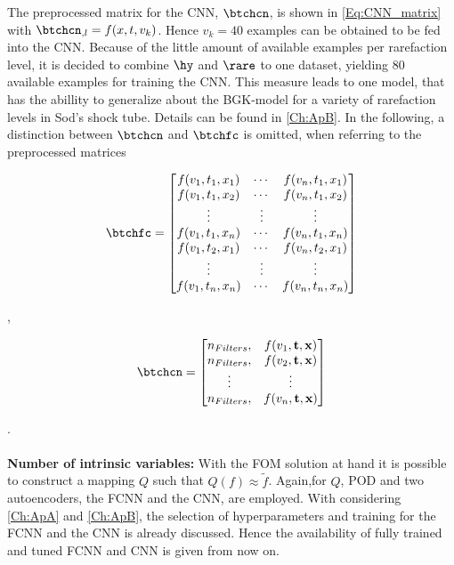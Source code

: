 The preprocessed matrix for the CNN, \(\btchcn\), is shown in \cref{Eq:CNN_matrix} with \(\btchcn_{,l} = f(x,t,v_k)\). Hence \(v_k=40\) examples can be obtained to be fed into the CNN. Because of the little amount of available examples per rarefaction level, it is decided to combine \(\hy\) and \(\rare\) to one dataset, yielding 80 available examples for training the CNN. This measure leads to one model, that has the abillity to generalize about the BGK-model for a variety of rarefaction levels in Sod's shock tube. Details can be found in \cref{Ch:ApB}. In the following, a distinction between \(\btchcn\) and \(\btchfc\) is omitted, when referring to the preprocessed matrices\\
\begin{minipage}{.45\linewidth}
	\begin{gather}
	\btchfc = \begin{bmatrix}
	f(v_1,t_1,x_1)&\cdots &f(v_n,t_1,x_1) \\
	f(v_1,t_1,x_2)&\cdots &f(v_n,t_1,x_2) \\
	\vdots& \vdots & \vdots\\
	f(v_1,t_1,x_n)&\cdots &f(v_n,t_1,x_n)\\
	f(v_1,t_2,x_1)&\cdots &f(v_n,t_2,x_1)\\
	\vdots & \vdots & \vdots\\
	f(v_1,t_n,x_n)&\cdots &f(v_n,t_n,x_n)
	\end{bmatrix}
	\label{Eq:AE_matrix}
	\end{gather}
\end{minipage},\qquad%
\begin{minipage}{.35\linewidth}
	\begin{gather}
	\btchcn= \begin{bmatrix}
	n_{Filters},&f(v_1,\textbf{t},\textbf{x})\\
	n_{Filters},&f(v_2,\textbf{t},\textbf{x})\\
	\vdots&\vdots\\
	n_{Filters},&f(v_n,\textbf{t},\textbf{x})
	\end{bmatrix}
	\label{Eq:CNN_matrix}
	\end{gather}
\end{minipage}\textrm{.}\\\\
\textbf{Number of intrinsic variables:} With the FOM solution at hand it is possible to construct a mapping \(Q\) such that \(Q(f)\approx \tilde{f}\). Again,for \(Q\), POD and two autoencoders, the FCNN and the CNN, are employed. With considering \cref{Ch:ApA} and \cref{Ch:ApB}, the selection of hyperparameters and training for the FCNN and the CNN is already discussed. Hence the availability of fully trained and tuned FCNN and CNN is given from now on.\\
